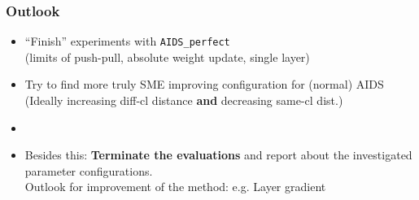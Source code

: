 \begin{frame}\frametitle{Outlook}
	\begin{itemize}
		\item \enquote{Finish} experiments with \texttt{AIDS\_perfect}\\
		(limits of push-pull, absolute weight update, single layer)
		\item Try to find more truly SME improving configuration for (normal) AIDS\\
		(Ideally increasing diff-cl distance \textbf{and} decreasing same-cl dist.)
		\item[]
		\item Besides this: \textbf{Terminate the evaluations} and report about the investigated parameter configurations.\\
		Outlook for improvement of the method: e.g. Layer gradient
	\end{itemize}	
\end{frame}

